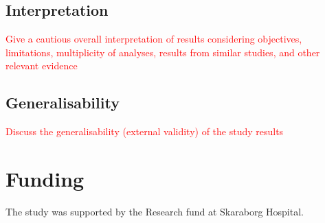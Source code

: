\documentclass[a4paper,12pt]{article}
\begin{document}
\subsection{Interpretation} \textcolor{red}{Give a cautious overall interpretation of results considering objectives, limitations, multiplicity of analyses, results from similar studies, and other relevant evidence}
\subsection{Generalisability} \textcolor{red}{Discuss the generalisability (external validity) of the study results}

\section{Funding} The study was supported by the Research fund at Skaraborg Hospital.


% 



\end{document}
